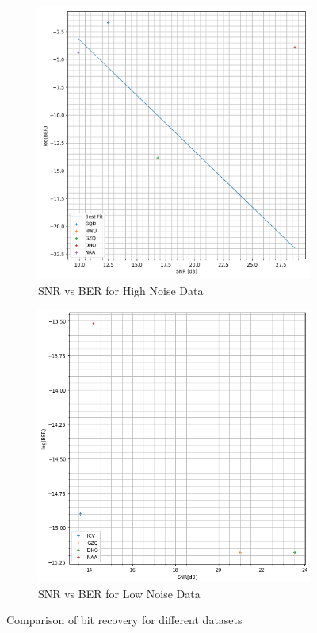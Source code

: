 \begin{figure}[h!]
    \begin{subfigure}[b]{0.5\textwidth}
    \centering
    \includegraphics[width = \textwidth]{figs/sim/symRecovery/snrvber_real.png}
    \caption{SNR vs BER for High Noise Data}
    \label{fig:snrwins}
    \end{subfigure}
    \begin{subfigure}[b]{0.5\textwidth}
    \centering
    \includegraphics[width = \textwidth]{figs/sim/symRecovery/charmyber.png}
    \caption{SNR vs BER for Low Noise Data}
    \label{snr:charmy}
    \end{subfigure}
    \caption{Comparison of bit recovery for different datasets}
\end{figure}
\pagebreak
